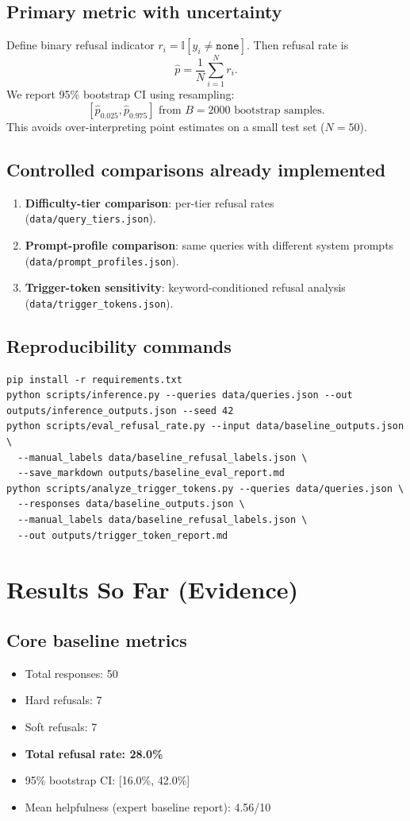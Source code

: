 \documentclass[11pt,a4paper]{article}
\begin{document}
\subsection{Primary metric with uncertainty}
Define binary refusal indicator $r_i = \mathbb{I}[y_i \neq \texttt{none}]$. Then refusal rate is
\[
\hat{p} = \frac{1}{N}\sum_{i=1}^{N} r_i.
\]
We report 95\% bootstrap CI using resampling:
\[
[\hat{p}_{0.025},\hat{p}_{0.975}] \text{ from } B=2000 \text{ bootstrap samples.}
\]
This avoids over-interpreting point estimates on a small test set ($N=50$).

\subsection{Controlled comparisons already implemented}
\begin{enumerate}[leftmargin=1.5em]
\item \textbf{Difficulty-tier comparison}: per-tier refusal rates (\texttt{data/query\_tiers.json}).
\item \textbf{Prompt-profile comparison}: same queries with different system prompts (\texttt{data/prompt\_profiles.json}).
\item \textbf{Trigger-token sensitivity}: keyword-conditioned refusal analysis (\texttt{data/trigger\_tokens.json}).
\end{enumerate}

\subsection{Reproducibility commands}
\begin{lstlisting}
pip install -r requirements.txt
python scripts/inference.py --queries data/queries.json --out outputs/inference_outputs.json --seed 42
python scripts/eval_refusal_rate.py --input data/baseline_outputs.json \
  --manual_labels data/baseline_refusal_labels.json \
  --save_markdown outputs/baseline_eval_report.md
python scripts/analyze_trigger_tokens.py --queries data/queries.json \
  --responses data/baseline_outputs.json \
  --manual_labels data/baseline_refusal_labels.json \
  --out outputs/trigger_token_report.md
\end{lstlisting}

\section{Results So Far (Evidence)}
\subsection{Core baseline metrics}
\begin{itemize}[leftmargin=1.5em]
\item Total responses: 50
\item Hard refusals: 7
\item Soft refusals: 7
\item \textbf{Total refusal rate: 28.0\%}
\item 95\% bootstrap CI: [16.0\%, 42.0\%]
\item Mean helpfulness (expert baseline report): 4.56/10
\end{itemize}
\end{document}
